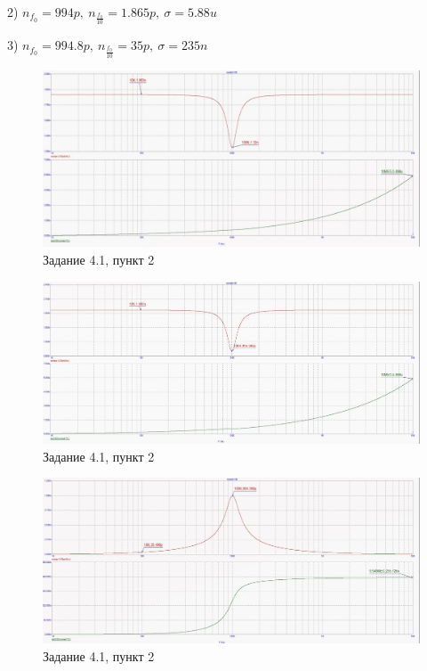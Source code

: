 \documentclass[a4paper, 14pt]{extarticle}%
\begin{document}
2) $n_{f_0} = 994p, \: n_{\frac{f_0}{10}} = 1.865p, \: \sigma = 5.88u$

3) $n_{f_0} = 994.8p, \: n_{\frac{f_0}{10}} = 35p, \: \sigma = 235n$

\begin{figure}[h!]
			\centering
			\includegraphics[width=1.1\linewidth]{4/4_1_3.jpg}
			\caption{Задание 4.1, пункт 2}
			\label{A}
\end{figure}




\begin{figure}[h!]
			\centering
			\includegraphics[width=1.1\linewidth]{4/4_1_5.jpg}
			\caption{Задание 4.1, пункт 2}
			\label{A}
\end{figure}



\begin{figure}[h!]
			\centering
			\includegraphics[width=1.1\linewidth]{4/4_1_4.jpg}
			\caption{Задание 4.1, пункт 2}
			\label{A}
\end{figure}
\end{document}
